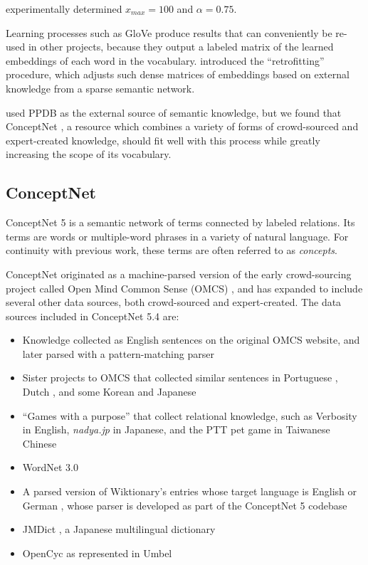 \documentclass[letterpaper]{article}
\begin{document}
 experimentally determined $x_{max}=100$ and
$\alpha=0.75$.

Learning processes such as GloVe produce results that can conveniently be
re-used in other projects, because they output a labeled matrix of the learned
embeddings of each word in the vocabulary.
introduced the ``retrofitting'' procedure, which adjusts such dense matrices of
embeddings based on external knowledge from a sparse semantic network.

 used PPDB \cite{ganitkevitch2013ppdb} as
the external source of semantic knowledge, but we found that ConceptNet
\cite{speer2012conceptnet}, a resource which combines a variety of forms of
crowd-sourced and expert-created knowledge, should fit well with this process
while greatly increasing the scope of its vocabulary.

\subsection{ConceptNet}
ConceptNet 5 \cite{speer2012conceptnet} is a semantic network of terms
connected by labeled relations. Its terms are words or multiple-word phrases
in a variety of natural language. For continuity with previous work,
these terms are often referred to as {\em concepts}.

ConceptNet originated as a machine-parsed version of the early crowd-sourcing
project called Open Mind Common Sense (OMCS) \cite{singh2002omcs}, and has expanded
to include several other data sources, both crowd-sourced and expert-created.
The data sources included in ConceptNet 5.4 are:

\begin{itemize}
\item Knowledge collected as English sentences on the original OMCS website,
    and later parsed with a pattern-matching parser
\item Sister projects to OMCS that collected similar sentences in Portuguese
    \cite{anacleto2006portuguese},
    Dutch \cite{eckhardt2008kid}, and some Korean and Japanese
    \cite{chung2006globalmind}
\item ``Games with a purpose'' that collect relational knowledge, such as
    Verbosity \cite{vonahn2006verbosity} in English, {\em nadya.jp}
    \cite{nakahara2011nadya} in Japanese, and the PTT pet game \cite{kuo2009petgame}
    in Taiwanese Chinese
\item WordNet 3.0 \cite{miller1998wordnet}
\item A parsed version of Wiktionary's entries whose target language is English
    or German \cite{wiktionary2014en} \cite{wiktionary2014de}, whose parser is
    developed as part of the ConceptNet 5 codebase
\item JMDict \cite{breen2004jmdict}, a Japanese multilingual dictionary
\item OpenCyc \cite{matuszek2006cyc} as represented in Umbel \cite{bergman2008umbel}
\end{itemize}
\end{document}
